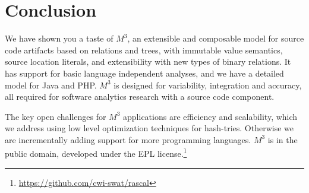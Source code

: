 \documentclass[conference]{IEEEtran}
\newcommand{\mthree}{\ensuremath{M^3}\xspace}
\begin{document}
\section{Conclusion}

We have shown you a taste of \mthree, an extensible and composable model for
source code artifacts based on relations and trees, with immutable value
semantics, source location literals, and extensibility with new types of binary relations. It has
support for basic language independent analyses, and we have a detailed model
for Java and PHP. \mthree is designed for variability, integration and accuracy, all required for software analytics research with a source code component.


The key open challenges for \mthree applications are efficiency and scalability, which we address using low level optimization techniques for hash-tries. Otherwise we are incrementally adding support for more programming languages. \mthree is in the public domain, developed under the EPL license.\!\footnote{\href{https://github.com/cwi-swat/rascal/tree/master/src/org/rascalmpl/library/analysis/m3}{https://github.com/cwi-swat/rascal}}



\end{document}

